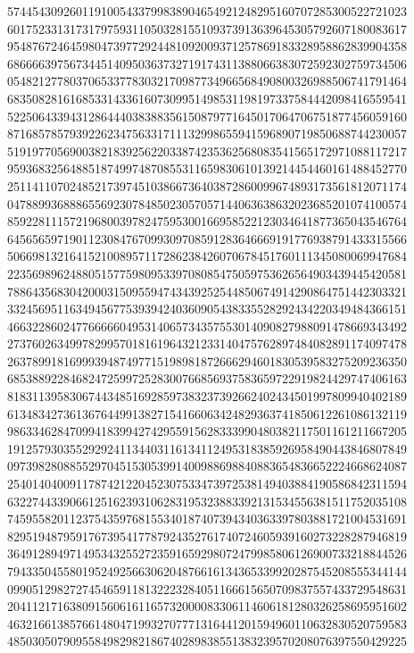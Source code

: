 {{    5744543092601191005433799838904654921248295160707285300522721023 ~
    6017523313173179759311050328155109373913639645305792607180083617 ~
    9548767246459804739772924481092009371257869183328958862839904358 ~
    6866663975673445140950363732719174311388066383072592302759734506 ~
    0548212778037065337783032170987734966568490800326988506741791464 ~
    6835082816168533143361607309951498531198197337584442098416559541 ~
    5225064339431286444038388356150879771645017064706751877456059160 ~
    8716857857939226234756331711132998655941596890719850688744230057 ~
    5191977056900382183925622033874235362568083541565172971088117217 ~
    9593683256488518749974870855311659830610139214454460161488452770 ~
    2511411070248521739745103866736403872860099674893173561812071174 ~
    0478899368886556923078485023057057144063638632023685201074100574 ~
    8592281115721968003978247595300166958522123034641877365043546764 ~
    6456565971901123084767099309708591283646669191776938791433315566 ~
    5066981321641521008957117286238426070678451760111345080069947684 ~
    2235698962488051577598095339708085475059753626564903439445420581 ~
    7886435683042000315095594743439252544850674914290864751442303321 ~
    3324569511634945677539394240360905438335528292434220349484366151 ~
    4663228602477666660495314065734357553014090827988091478669343492 ~
    2737602634997829957018161964321233140475762897484082891174097478 ~
    2637899181699939487497715198981872666294601830539583275209236350 ~
    6853889228468247259972528300766856937583659722919824429747406163 ~
    8183113958306744348516928597383237392662402434501997809940402189 ~
    6134834273613676449913827154166063424829363741850612261086132119 ~
    9863346284709941839942742955915628333990480382117501161211667205 ~
    1912579303552929241134403116134112495318385926958490443846807849 ~
    0973982808855297045153053991400988698840883654836652224668624087 ~
    2540140400911787421220452307533473972538149403884190586842311594 ~
    6322744339066125162393106283195323883392131534556381511752035108 ~
    7459558201123754359768155340187407394340363397803881721004531691 ~
    8295194879591767395417787924352761740724605939160273228287946819 ~
    3649128949714953432552723591659298072479985806126900733218844526 ~
    7943350455801952492566306204876616134365339920287545208555344144 ~
    0990512982727454659118132223284051166615650709837557433729548631 ~
    2041121716380915606161165732000083306114606181280326258695951602 ~
    4632166138576614804719932707771316441201594960110632830520759583 ~
    4850305079095584982982186740289838551383239570208076397550429225 ~
}}
